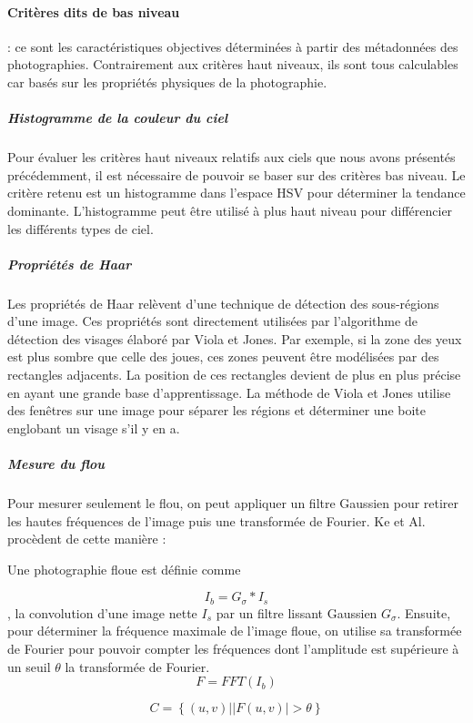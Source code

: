 \documentclass[11pt, french,screen]{report-rd-info}
\begin{document}
\paragraph{Critères dits de bas niveau} : ce sont les caractéristiques objectives déterminées à partir des métadonnées des photographies. Contrairement aux critères haut niveaux, ils sont tous calculables car basés sur les propriétés physiques de la photographie.
\subparagraph{Histogramme de la couleur du ciel}
Pour évaluer les critères haut niveaux relatifs aux ciels que nous avons présentés précédemment, il est nécessaire de pouvoir se baser sur des critères bas niveau. Le critère retenu est un histogramme dans l’espace HSV pour déterminer la tendance dominante. L’histogramme peut être utilisé à plus haut niveau pour différencier les différents types de ciel.
\subparagraph{Propriétés de Haar}
Les propriétés de Haar relèvent d’une technique de détection des sous-régions d’une image. Ces propriétés sont directement utilisées par l’algorithme de détection des visages élaboré par Viola et Jones. Par exemple, si la zone des yeux est plus sombre que celle des joues, ces zones peuvent être modélisées par des rectangles adjacents. La position de ces rectangles devient de plus en plus précise en ayant une grande base d’apprentissage. La méthode de Viola et Jones utilise des fenêtres sur une image pour séparer les régions et déterminer une boite englobant un visage s’il y en a.
\subparagraph{Mesure du flou}
Pour mesurer seulement le flou, on peut appliquer un filtre Gaussien pour retirer les hautes fréquences de l’image puis une transformée de Fourier. Ke et Al.\cite{Ke} procèdent de cette manière : 

Une photographie floue est définie comme

\begin{equation}
I_b = G_\sigma * I_s 
\end{equation}, la convolution d'une image nette $I_s$ par un filtre lissant Gaussien $G_\sigma$.
Ensuite, pour déterminer la fréquence maximale de l'image floue, on utilise sa transformée de Fourier pour pouvoir compter les fréquences dont l'amplitude est supérieure à un seuil $\theta$ la transformée de Fourier.
\begin{equation}
F = FFT(I_b)
\end{equation}

\begin{equation}
C = \left\{(u,v) | |F(u,v)| > \theta\right\}
\end{equation}
 
\end{document}
